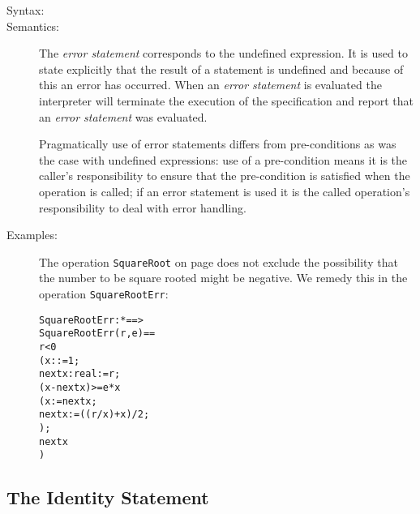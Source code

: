 \documentclass[\pformat,12pt]{article}
\begin{document}
\begin{description}
\item[Syntax:]


\item[Semantics:] The {\it error statement} corresponds to the
undefined expression. It is used to state explicitly that the result
of a statement is undefined and because of this an error has occurred.
When an {\it error statement} is evaluated the
interpreter will
terminate the execution of the specification and report that an {\it
error statement} was evaluated.

  Pragmatically use of error statements differs from
  pre-conditions as was the case with undefined expressions: use of a
  pre-condition means it is the caller's 
  responsibility to ensure that the pre-condition is satisfied when
  the operation is called; if an error statement is used it is the
  called operation's responsibility to deal with error handling.


\item[Examples:] The operation \texttt{SquareRoot} on page
  \pageref{squarerootDef} does not exclude
  the possibility that the number to be square rooted might be
  negative. We remedy this in the operation \texttt{SquareRootErr}:
  \begin{alltt}
  SquareRootErr :  *  ==> 
  SquareRootErr (r,e) ==
     r < 0
      ( x: := 1;
        nextx\keyw:{real} := r;
        (x - nextx) >= e * x 
         ( x := nextx;
           nextx := ((r / x) + x) / 2;
         );
        nextx
      )
  \end{alltt}
\end{description}

\subsection{The Identity Statement}
\end{document}

